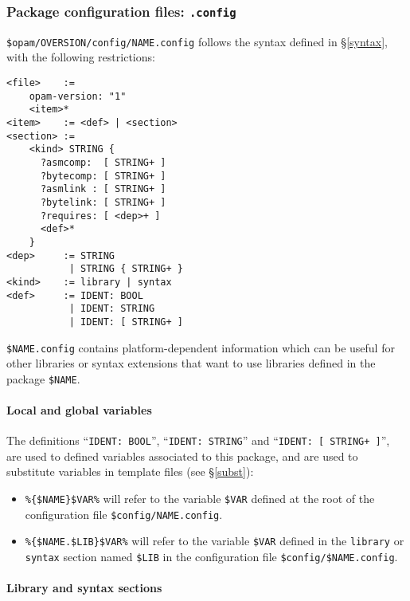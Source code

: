 \documentclass[a4paper,11pt]{article}
\begin{document}
\subsubsection{Package configuration files: {\tt .config}}
\label{dotconfig}

\verb+$opam/OVERSION/config/NAME.config+ follows the syntax defined in
\S\ref{syntax}, with the following restrictions:

{\small
\begin{Verbatim}[frame=single]
<file>    :=
    opam-version: "1"
    <item>*
<item>    := <def> | <section>
<section> :=
    <kind> STRING {
      ?asmcomp:  [ STRING+ ]
      ?bytecomp: [ STRING+ ]
      ?asmlink : [ STRING+ ]
      ?bytelink: [ STRING+ ]
      ?requires: [ <dep>+ ]
      <def>*
    }
<dep>     := STRING 
           | STRING { STRING+ }
<kind>    := library | syntax
<def>     := IDENT: BOOL
           | IDENT: STRING
           | IDENT: [ STRING+ ]
\end{Verbatim}
}

\verb+$NAME.config+ contains platform-dependent information which can
be useful for other libraries or syntax extensions that want to use
libraries defined in the package \verb+$NAME+.

\paragraph{Local and global variables}

The definitions ``{\tt IDENT: BOOL}'', ``{\tt IDENT: STRING}'' and ``{\tt IDENT:
  [ STRING+ ]}'', are used to defined variables associated to this
package, and are used to substitute variables in template files (see
\S\ref{subst}):

\begin{itemize}

\item \verb+%{$NAME}$VAR%+ will refer to the variable \verb+$VAR+
  defined at the root of the configuration file \verb+$config/NAME.config+.

\item \verb+%{$NAME.$LIB}$VAR%+ will refer to the variable \verb+$VAR+
  defined in the {\tt library} or {\tt syntax} section named
  \verb+$LIB+ in the configuration file \verb+$config/$NAME.config+.

\end{itemize}

\paragraph{Library and syntax sections}
\end{document}
